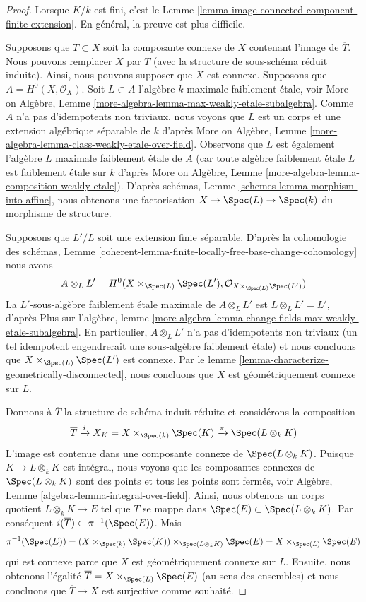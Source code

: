 \begin{proof}
Lorsque $K/k$ est fini, c'est le Lemme
\ref{lemma-image-connected-component-finite-extension}.
En général, la preuve est plus difficile.

\medskip\noindent
Supposons que $T \subset X$ soit la composante connexe de $X$
contenant l'image de $\overline{T}$. Nous pouvons remplacer $X$ par
$T$ (avec la structure de sous-schéma réduit induite). Ainsi, nous
pouvons supposer que $X$ est connexe. Supposons que $A = H^0(X,
\mathcal{O}_X)$. Soit $L \subset A$ l'algèbre $k$ maximale faiblement
\' étale, voir More on Algèbre, Lemme
\ref{more-algebra-lemma-max-weakly-etale-subalgebra}. Comme $A$ n'a pas
d'idempotents non triviaux, nous voyons que $L$ est un corps et une
extension algébrique séparable de $k$ d'après More on Algèbre, Lemme
\ref{more-algebra-lemma-class-weakly-etale-over-field}. Observons que $L$
est également l'algèbre $L$ maximale faiblement \' étale de $A$ (car toute
algèbre faiblement \' étale $L$ est faiblement \' étale sur $k$ d'après
More on Algèbre, Lemme \ref{more-algebra-lemma-composition-weakly-etale}).
D'après schémas, Lemme \ref{schemes-lemma-morphism-into-affine}, nous
obtenons une factorisation $X \to \Spec(L) \to \Spec(k)$ du morphisme de structure.

\medskip\noindent
Supposons que $L'/L$ soit une extension
finie séparable. D'après la cohomologie des
schémas, Lemme
\ref{coherent-lemma-finite-locally-free-base-change-cohomology} nous avons
$$
A \otimes_L L' =
H^0(X \times_{\Spec(L)} \Spec(L'), \mathcal{O}_{X \times_{\Spec(L)} \Spec(L')})
$$
La $L'$-sous-algèbre faiblement \' etale maximale de $A \otimes_L
L'$ est $L \otimes_L L' = L'$, d'après Plus sur l'algèbre, lemme
\ref{more-algebra-lemma-change-fields-max-weakly-etale-subalgebra}.
En particulier, $A \otimes_L L'$ n'a pas d'idempotents non
triviaux (un tel idempotent engendrerait une sous-algèbre faiblement
\' etale) et nous concluons que $X \times_{\Spec(L)} \Spec(L')$ est
connexe. Par le lemme
\ref{lemma-characterize-geometrically-disconnected}, nous concluons que $X$ est géométriquement connexe sur $L$.

\medskip\noindent
Donnons à $\overline{T}$ la structure de
schéma induit réduite et considérons la composition
$$
\overline{T} \xrightarrow{i} X_K = X \times_{\Spec(k)} \Spec(K)
\xrightarrow{\pi}
\Spec(L \otimes_k K)
$$
L'image est contenue dans une composante connexe de $\Spec(L
\otimes_k K)$. Puisque $K \to L \otimes_k K$ est intégral,
nous voyons que les composantes connexes de $\Spec(L \otimes_k
K)$ sont des points et tous les points sont fermés, voir
Algèbre, Lemme \ref{algebra-lemma-integral-over-field}. Ainsi,
nous obtenons un corps quotient $L \otimes_k K \to E$ tel que
$\overline{T}$ se mappe dans $\Spec(E) \subset \Spec(L \otimes_k
K)$. Par conséquent $i(\overline{T}) \subset \pi^{-1}(\Spec(E))$. Mais
$$
\pi^{-1}(\Spec(E)) =
(X \times_{\Spec(k)} \Spec(K)) \times_{\Spec(L \otimes_k K)} \Spec(E) =
X \times_{\Spec(L)} \Spec(E)
$$
qui est connexe parce que $X$ est géométriquement connexe sur
$L$. Ensuite, nous obtenons l'égalité $\overline{T} = X
\times_{\Spec(L)} \Spec(E)$ (au sens des ensembles) et nous
concluons que $\overline{T} \to X$ est surjective comme souhaité.
\end{proof}

